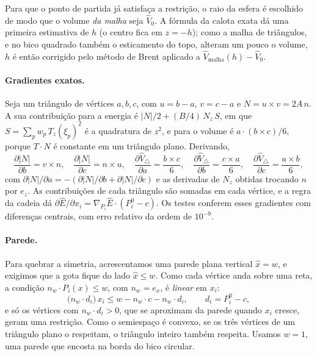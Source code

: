 \documentclass[12pt, oneside, a4paper, english, brazil]{abntex2}
\theoremstyle{relatorio}
\theoremstyle{relatorioit}
\theoremstyle{problema}
\newcommand{\Vh}{\hat V}
\newcommand{\Eh}{\hat E}
\begin{document}
Para que o ponto de partida já satisfaça a restrição, o raio da esfera é escolhido
de modo que o volume \emph{da malha} seja $\Vh_0$. A fórmula da calota exata dá uma
primeira estimativa de $h$ (o centro fica em $z = -h$); como a malha de triângulos, e
no bico quadrado também o esticamento do topo, alteram um pouco o volume, $h$ é então
corrigido pelo
método de Brent aplicado a $\Vh_{\text{malha}}(h) - \Vh_0$.

\paragraph{Gradientes exatos.} Seja um triângulo de vértices $a, b, c$, com
$u = b - a$, $v = c - a$ e $N = u \times v = 2A\,n$. A sua contribuição para a energia
é $|N|/2 + (B/4)\, N_z\, S$, em que $S = \sum_p w_p\, T_z(\xi_p)^2$ é a quadratura de
$z^2$, e para o volume é $a \cdot (b \times c)/6$, porque $T \cdot N$ é constante em
um triângulo plano. Derivando,
\begin{equation}
  \frac{\partial |N|}{\partial b} = v \times n, \quad
  \frac{\partial |N|}{\partial c} = n \times u, \quad
  \frac{\partial \Vh_\triangle}{\partial a} = \frac{b \times c}{6}, \quad
  \frac{\partial \Vh_\triangle}{\partial b} = \frac{c \times a}{6}, \quad
  \frac{\partial \Vh_\triangle}{\partial c} = \frac{a \times b}{6},
  \label{eq:grad-3d}
\end{equation}
com $\partial |N|/\partial a = -(\partial |N|/\partial b + \partial |N|/\partial c)$ e as
derivadas de $N_z$ obtidas trocando $n$ por $e_z$. As contribuições de cada triângulo
são somadas em cada vértice, e a regra da cadeia dá
$\partial \Eh / \partial x_i = \nabla_{P_i} \Eh \cdot (P_i^0 - c)$. Os testes conferem
esses gradientes com diferenças centrais, com erro relativo da ordem de $10^{-9}$.

\paragraph{Parede.} Para quebrar a simetria, acrescentamos uma parede plana vertical
$\hat x = w$, e exigimos que a gota fique do lado $\hat x \le w$. Como cada vértice
anda sobre uma reta, a condição $n_w \cdot P_i(x) \le w$, com $n_w = e_x$, é
\emph{linear} em $x_i$:
\begin{equation}
  \bigl(n_w \cdot d_i\bigr)\, x_i \le w - n_w \cdot c - n_w \cdot d_i,
  \qquad d_i = P_i^0 - c,
  \label{eq:parede}
\end{equation}
e só os vértices com $n_w \cdot d_i > 0$, que se aproximam da parede quando
$x_i$ cresce, geram uma restrição. Como o semiespaço é convexo, se os três vértices de
um triângulo plano o respeitam, o triângulo inteiro também respeita. Usamos $w = 1$,
uma parede que encosta na borda do bico circular.
\end{document}
